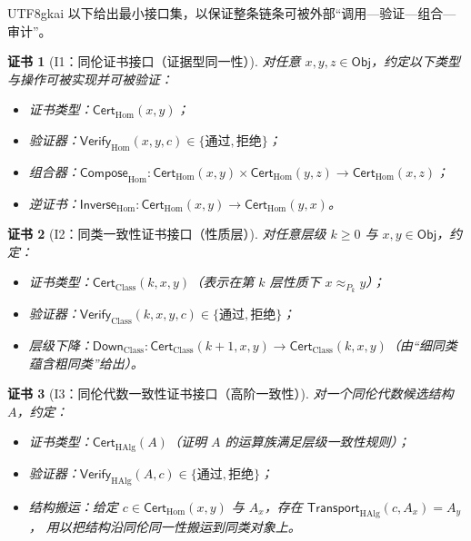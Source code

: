 \documentclass[12pt]{article}
\newtheorem{Certificate}{证书}[section]
\begin{document}
\begin{CJK*}{UTF8}{gkai}
以下给出最小接口集，以保证整条链条可被外部“调用—验证—组合—审计”。

\begin{Certificate}[I1：同伦证书接口（证据型同一性）]
\label{cert:tex19-appA-I1-hom}
对任意 $x,y,z\in\mathsf{Obj}$，约定以下类型与操作可被实现并可被验证：
\begin{itemize}
  \item 证书类型：$\mathsf{Cert}_{\mathrm{Hom}}(x,y)$；
  \item 验证器：$\mathsf{Verify}_{\mathrm{Hom}}(x,y,c)\in\{\text{通过},\text{拒绝}\}$；
  \item 组合器：$\mathsf{Compose}_{\mathrm{Hom}}:\mathsf{Cert}_{\mathrm{Hom}}(x,y)\times\mathsf{Cert}_{\mathrm{Hom}}(y,z)
    \to\mathsf{Cert}_{\mathrm{Hom}}(x,z)$；
  \item 逆证书：$\mathsf{Inverse}_{\mathrm{Hom}}:\mathsf{Cert}_{\mathrm{Hom}}(x,y)\to\mathsf{Cert}_{\mathrm{Hom}}(y,x)$。
\end{itemize}
\end{Certificate}

\begin{Certificate}[I2：同类一致性证书接口（性质层）]
\label{cert:tex19-appA-I2-class}
对任意层级 $k\ge 0$ 与 $x,y\in\mathsf{Obj}$，约定：
\begin{itemize}
  \item 证书类型：$\mathsf{Cert}_{\mathrm{Class}}(k,x,y)$（表示在第 $k$ 层性质下 $x\approx_{P_k}y$）；
  \item 验证器：$\mathsf{Verify}_{\mathrm{Class}}(k,x,y,c)\in\{\text{通过},\text{拒绝}\}$；
  \item 层级下降：$\mathsf{Down}_{\mathrm{Class}}:\mathsf{Cert}_{\mathrm{Class}}(k+1,x,y)\to\mathsf{Cert}_{\mathrm{Class}}(k,
    x,y)$（由“细同类蕴含粗同类”给出）。
\end{itemize}
\end{Certificate}

\begin{Certificate}[I3：同伦代数一致性证书接口（高阶一致性）]
\label{cert:tex19-appA-I3-halg}
对一个同伦代数候选结构 $A$，约定：
\begin{itemize}
  \item 证书类型：$\mathsf{Cert}_{\mathrm{HAlg}}(A)$（证明 $A$ 的运算族满足层级一致性规则）；
  \item 验证器：$\mathsf{Verify}_{\mathrm{HAlg}}(A,c)\in\{\text{通过},\text{拒绝}\}$；
  \item 结构搬运：给定 $c\in\mathsf{Cert}_{\mathrm{Hom}}(x,y)$ 与 $A_x$，存在 $\mathsf{Transport}_{\mathrm{HAlg}}(c,A_x)=A_y$，
  用以把结构沿同伦同一性搬运到同类对象上。
\end{itemize}
\end{Certificate}


\end{CJK*}
\end{document}
